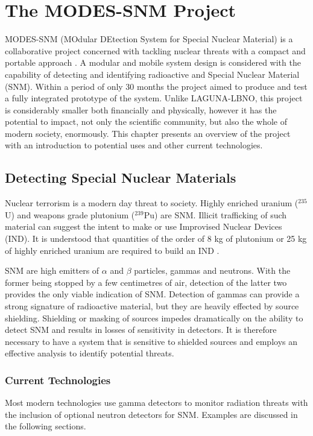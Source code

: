 \chapter{The MODES-SNM Project}
MODES-SNM (MOdular DEtection System for Special Nuclear Material) is a collaborative project concerned with tackling nuclear threats with a compact and portable approach \cite{website:modes}. A modular and mobile system design is considered with the capability of detecting and identifying radioactive and Special Nuclear Material (SNM). Within a period of only 30 months the project aimed to produce and test a fully integrated prototype of the system. Unlike LAGUNA-LBNO, this project is considerably smaller both financially and physically, however it has the potential to impact, not only the scientific community, but also the whole of modern society, enormously. This chapter presents an overview of the project with an introduction to potential uses and other current technologies.

\section{Detecting Special Nuclear Materials}
Nuclear terrorism is a modern day threat to society. Highly enriched uranium ($^{235}$U) and weapons grade plutonium ($^{239}$Pu) are SNM. Illicit trafficking of such material can suggest the intent to make or use Improvised Nuclear Devices (IND). It is understood that quantities of the order of 8 kg of plutonium or 25 kg of highly enriched uranium are required to build an IND \cite{modesIAEABorder}. 

SNM are high emitters of $\alpha$ and $\beta$ particles, gammas and neutrons. With the former being stopped by a few centimetres of air, detection of the latter two provides the only viable indication of SNM. Detection of gammas can provide a strong signature of radioactive material, but they are heavily effected by source shielding. Shielding or masking of sources impedes dramatically on the ability to detect SNM and results in losses of sensitivity in detectors. It is therefore necessary to have a system that is sensitive to shielded sources and employs an effective analysis to identify potential threats.

\subsection{Current Technologies}
Most modern technologies use gamma detectors to monitor radiation threats with the inclusion of optional neutron detectors for SNM. Examples are discussed in the following sections.
